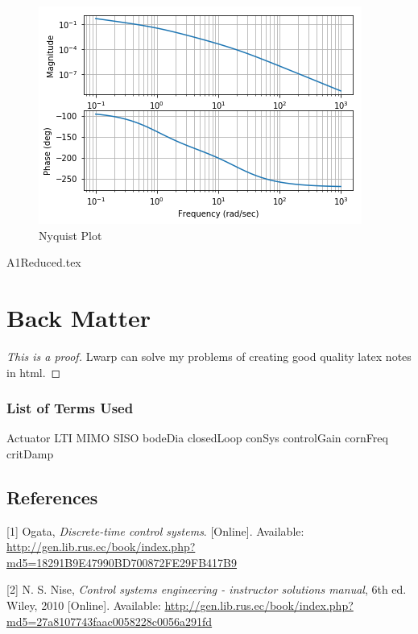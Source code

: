 \documentclass{scrreprt}
\theoremstyle{plain}
\theoremstyle{definition}
\theoremstyle{remark}
\begin{document}
\begin{figure}
	\includegraphics[width=0.7\linewidth]{Assignments/A1/ipython_files/qt_img492813137477636}
	\caption{Nyquist Plot}
\end{figure}

{A1Reduced.tex}
\part{Back Matter}

\begin{proof}[This is a proof]
	Lwarp can solve my problems of creating good quality latex notes in html.
\end{proof}
\section*{List of Terms Used}
\gls{Actuator} \gls{LTI} \gls{MIMO} \gls{SISO} \gls{bodeDia} \gls{closedLoop} \gls{conSys} \gls{controlGain} \gls{cornFreq} \gls{critDamp} 


\chapter*{References}\label{references}

\hypertarget{refs}{}
\hypertarget{ref-book:129711}{}
{[}1{]} Ogata, \emph{Discrete-time control systems}. {[}Online{]}.
Available:
\url{http://gen.lib.rus.ec/book/index.php?md5=18291B9E47990BD700872FE29FB417B9}

\hypertarget{ref-textbook:niseSolution}{}
{[}2{]} N. S. Nise, \emph{Control systems engineering - instructor
	solutions manual}, 6th ed. Wiley, 2010 {[}Online{]}. Available:
\url{http://gen.lib.rus.ec/book/index.php?md5=27a8107743faac0058228c0056a291fd}
\end{document}
